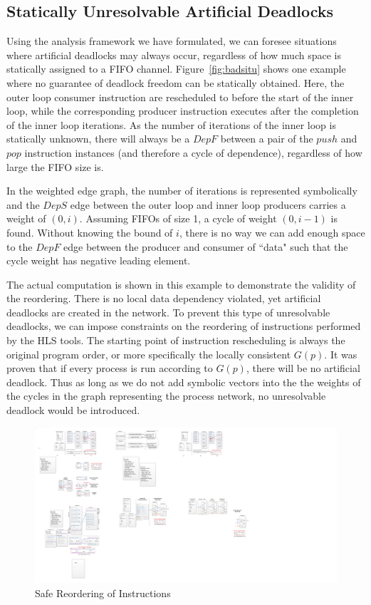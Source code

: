 \subsection{Statically Unresolvable Artificial Deadlocks}
Using the analysis framework we have formulated, we can foresee situations
where artificial deadlocks may always occur, regardless of how much
space is statically assigned to a FIFO channel. Figure~\ref{fig:badsitu}
shows one example where no guarantee of deadlock freedom can be
statically obtained. 
Here, the outer loop consumer instruction
are rescheduled to before the start of the inner loop, while the corresponding producer instruction
executes after the completion of the inner loop iterations. As the
number of iterations of the inner loop is statically unknown, there will
always be a $DepF$ between a pair of the $push$ and $pop$ instruction instances (and therefore a cycle of dependence),
regardless of how large the FIFO size is. 

In the weighted edge graph, the number of iterations is represented
symbolically and the $DepS$ edge between the outer loop and inner loop producers carries a weight of $(0,i)$. Assuming FIFOs of size 1, a cycle of weight $(0, i-1)$ is found. Without knowing the bound of $i$, there is no way we can add enough
space to the $DepF$ edge between the producer and consumer of ``data" such
that the cycle weight has negative leading element.


The actual computation is shown
in this example to demonstrate the validity of the reordering. There is no local data dependency violated, yet artificial deadlocks are created in the network.
To prevent this type of unresolvable deadlocks, we can impose constraints on the
reordering of instructions performed by the HLS tools. The starting point of
instruction rescheduling is always the original program order, or more specifically the locally consistent $G(p)$. 
It was proven that if every process is run according to $G(p)$, there will be no artificial deadlock. Thus as long as we do not add symbolic vectors into the the weights of the cycles in the graph representing the process network, no unresolvable deadlock would be introduced.
\begin{figure}[htp]
\begin{center}
\includegraphics[width=1.0\linewidth]{chap4fig/safeRule.pdf}
\caption{Safe Reordering of Instructions
\label{fig:safeReschdule}}
\end{center}
\end{figure}


